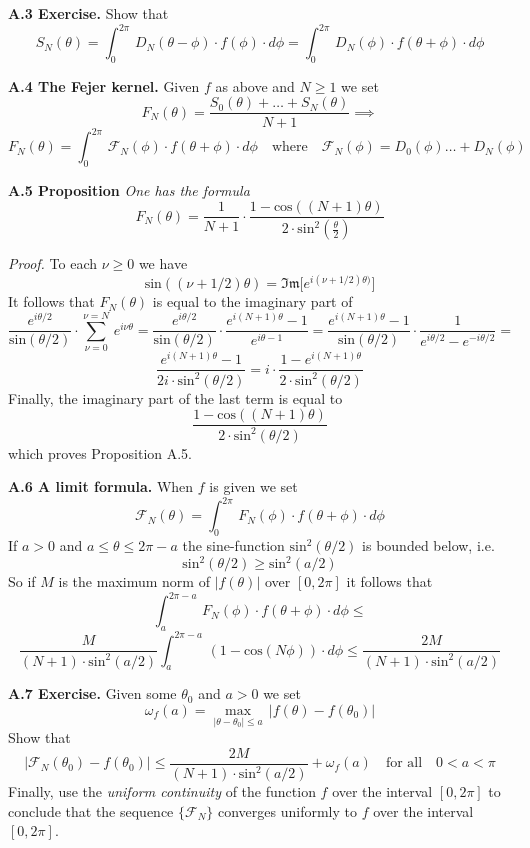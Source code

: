\documentclass{amsart}
\begin{document}
\noindent
{\bf A.3 Exercise.}
Show that
\[ S_N(\theta)=\int_0^{2\pi}\, D_N(\theta-\phi)\cdot f(\phi)\cdot d\phi=
\int_0^{2\pi}\, D_N(\phi)\cdot f(\theta+\phi)\cdot d\phi
\]
\medskip

\noindent
{\bf A.4 The Fejer kernel.}
Given $f$ as above and $N\geq1$ we set
\[
F_N(\theta)=\frac{S_0(\theta)+\ldots+S_N(\theta)}{N+1}\implies
\]
\[ F_N(\theta)=\int_0^{2\pi}\,\mathcal F_N(\phi)\cdot f(\theta+\phi)\cdot d\phi
\quad\text{where}\quad
\mathcal F_N(\phi)= D_0(\phi)\ldots+D_N(\phi)
\]
\medskip

\noindent
{\bf A.5 Proposition} \emph{One has the formula} 
\[
 F_N(\theta)=\frac{1}{N+1}\cdot\frac{1-\text{cos}((N+1)\theta)}{2\cdot \text{sin}^2(\frac{\theta}{2})}
 \]

 
 \noindent
 \emph{Proof.}
To each $\nu\geq 0$ we have
\[
\text{sin}((\nu+1/2)\theta)=
\mathfrak{Im} \bigl [e^{i(\nu+1/2)\theta)}\bigr]
\]
It follows that $F_N(\theta)$ is equal to the imaginary part of
\[
\frac{e^{i\theta/2}}{\text{sin}(\theta/2)}\cdot
\sum_{\nu=0}^{\nu=N}\, e^{i\nu\theta}=
\frac{e^{i\theta/2}}{\text{sin}(\theta/2)}\cdot
\frac{e^{i(N+1)\theta}-1}{e^{i\theta-1}}
=
\frac{e^{i(N+1)\theta}-1}{\text{sin}(\theta/2)}\cdot
\frac{1}{e^{i\theta/2}-e^{-i\theta/2}}=
\]
\[
\frac{e^{i(N+1)\theta}-1}{2i\cdot \text{sin}^2(\theta/2)}
=i\cdot \frac{1-e^{i(N+1)\theta}}{2\cdot \text{sin}^2(\theta/2)}
\]
Finally,  the imaginary part of the last term is equal to
\[
\frac{1-\text{cos}((N+1)\theta)}{2\cdot \text{sin}^2(\theta/2)}
\]
which proves Proposition A.5.

 \bigskip
 
 \noindent
{\bf A.6 A limit  formula.}
When $f$ is given we set
\[ 
\mathcal F_N(\theta)= \int_0^{2\pi}\, F_N(\phi)\cdot f(\theta+\phi)\cdot d\phi
\]
If $a>0$ and $a\leq\theta\leq 2\pi-a$
the sine-function  $\text{sin}^2(\theta/2)$ is bounded below, i.e.
\[
\text{sin}^2(\theta/2)\geq \text{sin}^2(a/2)
\]
So if  $M$ is the maximum norm of
$|f(\theta)|$ over $[0,2\pi]$
it follows that
\[
 \int_a^{2\pi-a}\, F_N(\phi)\cdot f(\theta+\phi)\cdot d\phi
\leq
\] 
\[
\frac{M}{(N+1)\cdot \text{sin}^2(a/2)}
 \int_a^{2\pi-a}\, (1-\text{cos}(N\phi))\cdot d\phi
\leq\frac{2M}{(N+1)\cdot \text{sin}^2(a/2)}
\]
\medskip

\noindent
{\bf A.7 Exercise.}
Given some $\theta_0$ and $a>0$ we set
\[
\omega_f(a)=\max_{|\theta-\theta_0|\leq a}\, |f(\theta)-f(\theta_0)|
\]
Show  that
\[
|\mathcal F_N(\theta_0)-f(\theta_0)|
\leq\frac{2M}{(N+1)\cdot \text{sin}^2(a/2)}+\omega_f(a)
\quad\text{for all}\quad 0<a<\pi
\]
Finally, use the \emph{uniform continuity}
of the function $f$ over the interval $[0,2\pi]$ to  conclude that
the sequence $\{\mathcal F_N\}$ converges uniformly to $f$ over
the interval $[0,2\pi]$.
\medskip
\end{document}
